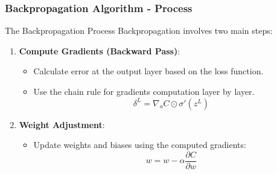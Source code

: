 \documentclass[aspectratio=169]{beamer}
\begin{document}
\begin{frame}[fragile]
    \frametitle{Backpropagation Algorithm - Process}
    \begin{block}{The Backpropagation Process}
        Backpropagation involves two main steps:
    \end{block}
    \begin{enumerate}
        \item \textbf{Compute Gradients (Backward Pass)}:
        \begin{itemize}
            \item Calculate error at the output layer based on the loss function.
            \item Use the chain rule for gradients computation layer by layer.
            \begin{equation}
                \delta^L = \nabla_a C \odot \sigma'(z^L)
            \end{equation}
        \end{itemize}

        \item \textbf{Weight Adjustment}:
        \begin{itemize}
            \item Update weights and biases using the computed gradients:
            \begin{equation}
                w = w - \alpha \frac{\partial C}{\partial w}
            \end{equation}
        \end{itemize}
    \end{enumerate}
\end{frame}
\end{document}
